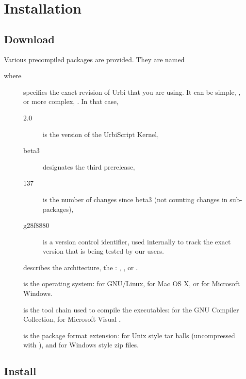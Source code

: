 \chapter{Installation}
\label{sec:installation}

\section{Download}

Various precompiled packages are provided.  They are named
\begin{center}
\end{center}
where
\begin{description}
\item[] specifies the exact revision of Urbi that you are
  using.  It can be simple, , or more complex,
  .  In that case,
  \begin{description}
  \item[2.0] is the version of the UrbiScript Kernel,
  \item[beta3] designates the third prerelease,
  \item[137] is the number of changes since beta3 (not counting
    changes in sub-packages),
  \item[g28f8880] is a version control identifier, used internally to
    track the exact version that is being tested by our users.
  \end{description}
\item[] describes the architecture, the :
  , , or .
\item[] is the operating system:  for GNU/Linux,
   for Mac OS X, or  for Microsoft Windows.
\item[] is the tool chain used to compile the
  executables:  for the GNU Compiler Collection, 
  for Microsoft Visual \Cxx.
\item[] is the package format extension:  for
  Unix style tar balls (uncompressed with ), and  for Windows style zip files.
\end{description}

\section{Install}

